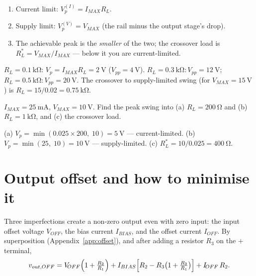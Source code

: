 \documentclass[11pt,a4paper,oneside]{book}
\begin{document}
\begin{protocol}
\begin{enumerate}[leftmargin=1.5cm]
  \item Current limit: $V_p^{(I)}=I_{MAX}R_L$.
  \item Supply limit: $V_p^{(V)}=V_{MAX}$ (the rail minus the output stage's
        drop).
  \item The achievable peak is the \emph{smaller} of the two; the crossover
        load is $R_L^*=V_{MAX}/I_{MAX}$ --- below it you are current-limited.
\end{enumerate}
\end{protocol}

\begin{wexample}[Swing for several loads, $I_{MAX}=\qty{20}{\milli\ampere}$]
$R_L=\qty{0.1}{\kilo\ohm}$: $V_{p}=I_{MAX}R_L=\qty{2}{\volt}$
($V_{pp}=\qty{4}{\volt}$). $R_L=\qty{0.3}{\kilo\ohm}\!:V_{pp}=\qty{12}{\volt}$;
$R_L=\qty{0.5}{\kilo\ohm}\!:V_{pp}=\qty{20}{\volt}$. The crossover to
supply-limited swing (for $V_{MAX}=\qty{15}{\volt}$) is
$R_L=15/0.02=\qty{0.75}{\kilo\ohm}$.
\end{wexample}

\begin{exercise}
$I_{MAX}=\qty{25}{\milli\ampere}$, $V_{MAX}=\qty{10}{\volt}$. Find the peak
swing into (a) $R_L=\qty{200}{\ohm}$ and (b) $R_L=\qty{1}{\kilo\ohm}$, and
(c) the crossover load.
\end{exercise}
\begin{solution}
(a) $V_p=\min(0.025\times200,\;10)=\qty{5}{\volt}$ --- current-limited.
(b) $V_p=\min(25,\;10)=\qty{10}{\volt}$ --- supply-limited.
(c) $R_L^*=10/0.025=\qty{400}{\ohm}$.
\end{solution}

\section{Output offset and how to minimise it}\label{sec:offset}
Three imperfections create a non-zero output even with zero input: the input
offset voltage $V_{\!OFF}$, the bias current $I_{BIAS}$, and the offset current
$I_{\!OFF}$. By superposition (Appendix~\ref{app:offset}), and after adding a
resistor $R_3$ on the $+$ terminal,
\[
v_{out,OFF}=V_{\!OFF}\Bigl(1+\tfrac{R_2}{R_1}\Bigr)
   +I_{BIAS}\Bigl[R_2-R_3\bigl(1+\tfrac{R_2}{R_1}\bigr)\Bigr]
   +I_{\!OFF}\,R_2 .
\]
\end{document}
